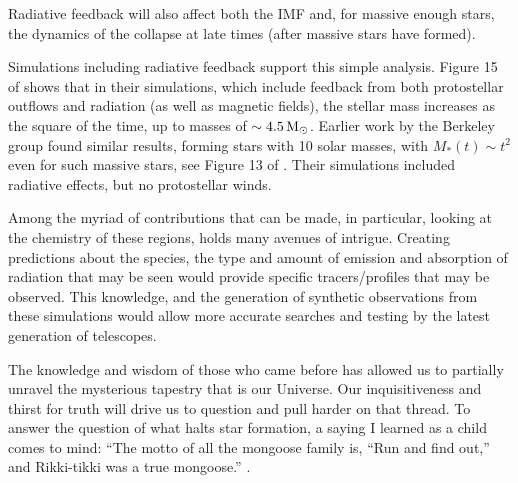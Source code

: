 \documentclass[../dissertation.tex]{subfiles}
\begin{document}
Radiative feedback will also affect both the IMF and, for massive enough stars, the dynamics of the collapse at late times (after massive stars have formed). 

Simulations including radiative feedback support this simple analysis. 
Figure 15 of  \citet{2014MNRAS.439.3420M} shows that in their simulations, 
which include feedback from both protostellar outflows and radiation (as well as magnetic fields), 
the stellar mass increases as the square of the time, up to masses of $\sim 4.5 {\,\rm M}_\odot$. 
Earlier work by the Berkeley group found similar results, forming stars with 10 solar masses, 
with $M_*(t) \sim t^2$ even for such massive stars, see Figure 13 of \citet{2012ApJ...754...71K}. 
Their simulations included radiative effects, but no protostellar winds. 

Among the myriad of contributions that can be made, in particular, looking at the chemistry of these regions, holds many avenues of intrigue. 
Creating predictions about the species, the type and amount of emission and absorption of radiation that may be seen would provide
specific tracers/profiles that may be observed.  
This knowledge, and the generation of synthetic observations from these simulations would allow more accurate searches and testing by the latest generation of telescopes. 

The knowledge and wisdom of those who came before has allowed us to partially unravel the mysterious tapestry that is our Universe.
Our inquisitiveness and thirst for truth will drive us to question and pull harder on that thread. 
To answer the question of what halts star formation, a saying I learned as a child comes to mind: “The motto of all the mongoose family is, ``Run and find out,'' and Rikki-tikki was a true mongoose.” \citep{Rikki_Tikki_Tavi}.

\end{document}
